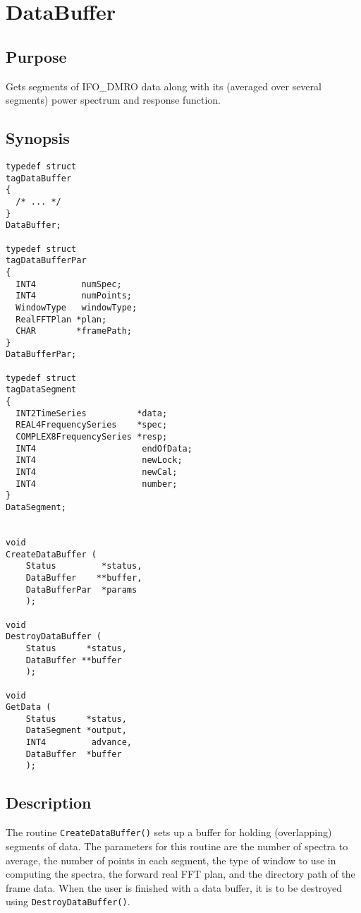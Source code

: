 \documentclass{article}
\begin{document}
\section{DataBuffer}

\subsection{Purpose}

Gets segments of IFO\_DMRO data along with its (averaged over several
segments) power spectrum and response function.

\subsection{Synopsis}

\begin{verbatim}
typedef struct
tagDataBuffer
{
  /* ... */
}
DataBuffer;

typedef struct
tagDataBufferPar
{
  INT4         numSpec;
  INT4         numPoints;
  WindowType   windowType;
  RealFFTPlan *plan;
  CHAR        *framePath;
}
DataBufferPar;

typedef struct
tagDataSegment
{
  INT2TimeSeries          *data;
  REAL4FrequencySeries    *spec;
  COMPLEX8FrequencySeries *resp;
  INT4                     endOfData;
  INT4                     newLock;
  INT4                     newCal;
  INT4                     number;
}
DataSegment;


void
CreateDataBuffer (
    Status         *status,
    DataBuffer    **buffer,
    DataBufferPar  *params
    );

void
DestroyDataBuffer (
    Status      *status,
    DataBuffer **buffer
    );

void
GetData (
    Status      *status,
    DataSegment *output,
    INT4         advance,
    DataBuffer  *buffer
    );
\end{verbatim}

\subsection{Description}

The routine \texttt{CreateDataBuffer()} sets up a buffer for holding
(overlapping) segments of data.  The parameters for this routine are the
number of spectra to average, the number of points in each segment, the type
of window to use in computing the spectra, the forward real FFT plan, and the
directory path of the frame data.  When the user is finished with a data
buffer, it is to be destroyed using \texttt{DestroyDataBuffer()}.
\end{document}
